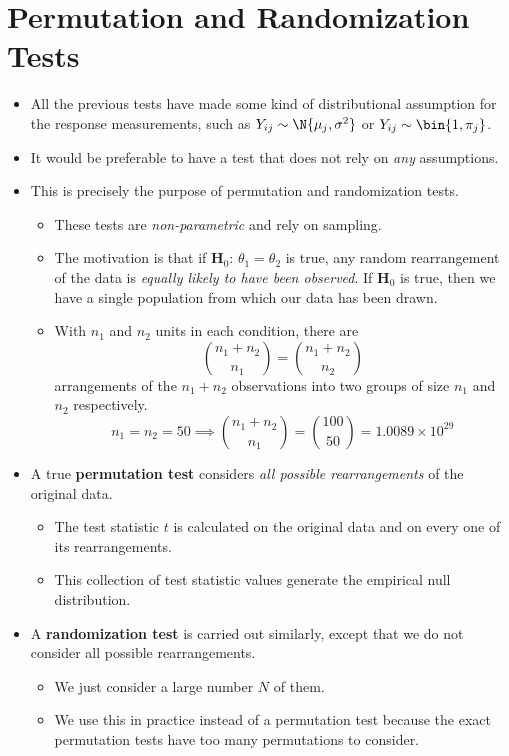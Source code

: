 \section{Permutation and Randomization Tests}
\begin{itemize}
      \item All the previous tests have made some kind of distributional assumption
            for the response measurements, such as $ Y_{ij} \sim \N{\mu_j,\sigma^2} $ or
            $ Y_{ij}\sim \bin{1,\pi_j} $.
      \item It would be preferable to have a test that does not rely on \emph{any}
            assumptions.
      \item This is precisely the purpose of permutation and randomization tests.
            \begin{itemize}
                  \item These tests are \emph{non-parametric} and rely on sampling.
                  \item The motivation is that if $ \mathbf{H}_0 $: $ \theta_1=\theta_2 $
                        is true, any random rearrangement of the data is \emph{equally likely
                              to have been observed}. If $ \mathbf{H}_0 $ is true, then we have a single population
                        from which our data has been drawn.
                  \item With $ n_1 $ and $ n_2 $ units in each condition, there are
                        \[ \binom{n_1+n_2}{n_1}=\binom{n_1+n_2}{n_2} \]
                        arrangements of the $ n_1+n_2 $ observations into two groups of size $ n_1 $
                        and $ n_2 $ respectively.
                        \[ n_1=n_2=50\implies\binom{n_1+n_2}{n_1}=\binom{100}{50}=1.0089\times 10^{29} \]
            \end{itemize}
      \item A true \textbf{permutation test} considers \emph{all possible rearrangements}
            of the original data.
            \begin{itemize}
                  \item The test statistic $ t $ is calculated on the original data and on every one of
                        its rearrangements.
                  \item This collection of test statistic values generate the empirical null distribution.
            \end{itemize}
      \item A \textbf{randomization test} is carried out similarly, except that we do not
            consider all possible rearrangements.
            \begin{itemize}
                  \item We just consider a large number $ N $ of them.
                  \item We use this in practice instead of a permutation test because
                        the exact permutation tests have too many permutations to consider.
            \end{itemize}
\end{itemize}
